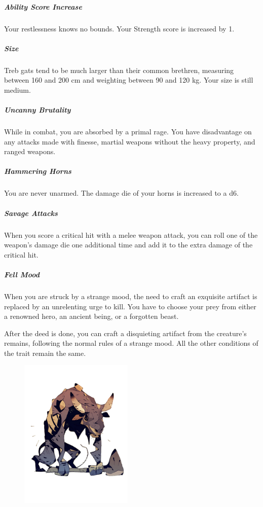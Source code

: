     \subparagraph{Ability Score Increase} Your restlessness knows no bounds.
    Your Strength score is increased by 1.

    \subparagraph{Size} Treb gats tend to be much larger than their common brethren, measuring between 160 and 200 cm and weighting between 90 and 120 kg.
    Your size is still medium.

    \subparagraph{Uncanny Brutality} While in combat, you are absorbed by a primal rage.
    You have disadvantage on any attacks made with finesse, martial weapons without the heavy property, and ranged weapons.

    \subparagraph{Hammering Horns} You are never unarmed.
    The damage die of your horns is increased to a d6.

    \subparagraph{Savage Attacks} When you score a critical hit with a melee weapon attack, you can roll one of the weapon's damage die one additional time and add it to the extra damage of the critical hit.

    \subparagraph{Fell Mood} When you are struck by a strange mood, the need to craft an exquisite artifact is replaced by an unrelenting urge to kill.
    You have to choose your prey from either a renowned hero, an ancient being, or a forgotten beast.

    After the deed is done, you can craft a disquieting artifact from the creature's remains, following the normal rules of a strange mood.
    All the other conditions of the trait remain the same.%

\begin{figure}[!b]
    \centering
    \includegraphics[width=0.48\textwidth]{04kins/img/11gat_treb.png}
\end{figure}

